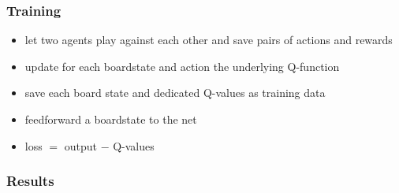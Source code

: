 \documentclass{beamer}
\begin{document}
 
 \begin{frame}
 \frametitle{Training}
 \begin{itemize}
\item let two agents play against each other and save pairs of actions and rewards
\item update for each boardstate and action the underlying Q-function
\item save each board state and dedicated Q-values as training data
\item feedforward a boardstate to the net
\item loss $=$ output $-$ Q-values
\end{itemize}
 \end{frame}
 
 \begin{frame}
 \frametitle{Results}
 \end{frame}
\end{document}
